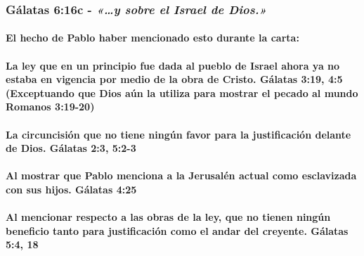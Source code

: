 \documentclass[11a pt,twoside]{article}
\newcommand{\scripture}[1]{%
  {\fontsize{12pt}{16pt}\selectfont\ScriptureFont\itshape #1}%
}
\let\oldsubsubsection\subsubsection
\renewcommand{\subsubsection}{\needspace{4\baselineskip}\oldsubsubsection}
\let\oldparagraph\paragraph
\renewcommand{\paragraph}{\needspace{3\baselineskip}\oldparagraph}
\begin{document}
\subsubsection{\texorpdfstring{Gálatas 6:16c -
\scripture{«…y sobre el Israel de Dios.»}}{Gálatas 6:16c - }}\label{guxe1latas-616c---y-sobre-el-israel-de-dios.}

\paragraph{El hecho de Pablo haber mencionado esto durante la
carta:}\label{el-hecho-de-pablo-haber-mencionado-esto-durante-la-carta}

\paragraph{La ley que en un principio fue dada al pueblo de Israel ahora
ya no estaba en vigencia por medio de la obra de Cristo. Gálatas 3:19,
4:5 (Exceptuando que Dios aún la utiliza para mostrar el pecado al mundo
Romanos
3:19-20)}\label{la-ley-que-en-un-principio-fue-dada-al-pueblo-de-israel-ahora-ya-no-estaba-en-vigencia-por-medio-de-la-obra-de-cristo.-guxe1latas-319-45-exceptuando-que-dios-auxfan-la-utiliza-para-mostrar-el-pecado-al-mundo-romanos-319-20}

\paragraph{La circuncisión que no tiene ningún favor para la
justificación delante de Dios. Gálatas 2:3,
5:2-3}\label{la-circuncisiuxf3n-que-no-tiene-ninguxfan-favor-para-la-justificaciuxf3n-delante-de-dios.-guxe1latas-23-52-3}

\paragraph{Al mostrar que Pablo menciona a la Jerusalén actual como
esclavizada con sus hijos. Gálatas
4:25}\label{al-mostrar-que-pablo-menciona-a-la-jerusaluxe9n-actual-como-esclavizada-con-sus-hijos.-guxe1latas-425}

\paragraph{Al mencionar respecto a las obras de la ley, que no tienen
ningún beneficio tanto para justificación como el andar del creyente.
Gálatas 5:4,
18}\label{al-mencionar-respecto-a-las-obras-de-la-ley-que-no-tienen-ninguxfan-beneficio-tanto-para-justificaciuxf3n-como-el-andar-del-creyente.-guxe1latas-54-18}
\end{document}
